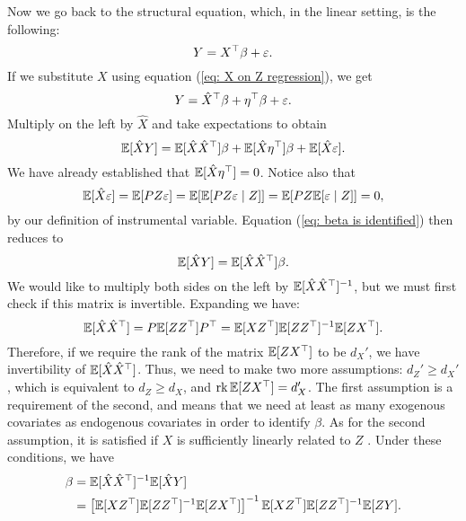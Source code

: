 Now we go back to the structural equation, which, in the linear setting, is the following:
\begin{equation}
    \label{eq: linear structural equation}
    Y = X^{ \top }\beta + \varepsilon
.\end{equation}
If we substitute $ X $ using equation (\ref{eq: X on Z regression}), we get
\begin{equation*}
    Y = \hat{ X }^{ \top } \beta + \eta^{ \top } \beta + \varepsilon
.\end{equation*}
Multiply on the left by $ \hat{ X } $ and take expectations to obtain
\begin{equation}
    \label{eq: beta is identified}
    \mathbb{E} [ \hat{ X } Y ] = \mathbb{E} [ \hat{ X } \hat{ X }^{ \top } ] \beta + \mathbb{E} [ \hat{ X } \eta^{ \top } ] \beta + \mathbb{E} [ \hat{ X } \varepsilon ]
.\end{equation}
We have already established that $ \mathbb{E} [ \hat{ X } \eta^{ \top } ] = 0 $.
Notice also that
\begin{equation*}
    \mathbb{E} [ \hat{ X } \varepsilon ]
    = \mathbb{E} [ PZ \varepsilon ]
    = \mathbb{E} [ \mathbb{E} [ PZ \varepsilon \mid Z ] ]
    = \mathbb{E} [ PZ \mathbb{E} [ \varepsilon \mid Z ] ]
    = 0
,\end{equation*}
by our definition of instrumental variable.
Equation (\ref{eq: beta is identified}) then reduces to
\begin{equation*}
    \mathbb{E} [ \hat{ X } Y ] = \mathbb{E} [ \hat{ X } \hat{ X }^{ \top } ] \beta
.\end{equation*}
We would like to multiply both sides on the left by $ \mathbb{E} [ \hat{ X } \hat{ X }^{ \top } ]^{ -1 } $, but we must first check if this matrix is invertible.
Expanding we have:
\begin{equation*}
    \mathbb{E} [ \hat{ X } \hat{ X }^{ \top } ]
    = P \mathbb{E} [ Z Z^{ \top } ] P^{ \top }
    = \mathbb{E} [ X Z^{ \top } ] \mathbb{E} [ Z Z^{ \top } ]^{ -1 } \mathbb{E} [ Z X^{ \top } ]
.\end{equation*}
Therefore, if we require the rank of the matrix $ \mathbb{E} [ Z X^{ \top } ] $ to be $ d_{ X }' $, we have invertibility of $ \mathbb{E} [ \hat{ X } \hat{ X }^{ \top } ] $.
Thus, we need to make two more assumptions: $ d_{ Z }' \geq d_{ X }' $, which is equivalent to $ d_{ Z } \geq d_{ X } $, and $ \operatorname{rk} \mathbb{E} [ Z X^{ \top } ] = d_{ X }' $.
The first assumption is a requirement of the second, and means that we need at least as many exogenous covariates as endogenous covariates in order to identify $ \beta $.
As for the second assumption, it is satisfied if $ X $ is sufficiently linearly related to $ Z $ \cite{wooldridge2001}. Under these conditions, we have
\begin{align}
    \label{eq: beta reduced}
    \beta
    &= \mathbb{E} [ \hat{ X } \hat{ X }^{ \top } ]^{ -1 } \mathbb{E} [ \hat{ X } Y ] \\
    &= \left[
        \mathbb{E} [ X Z^{ \top } ] \mathbb{E} [ Z Z^{ \top } ]^{ -1 } \mathbb{E} [ Z X^{ \top } ]
    \right]^{ -1 }
    \mathbb{E} [ X Z^{ \top } ] \mathbb{E} [ Z Z^{ \top } ]^{ -1 } \mathbb{E} [ Z Y ] \label{eq: beta expanded}
.\end{align}


